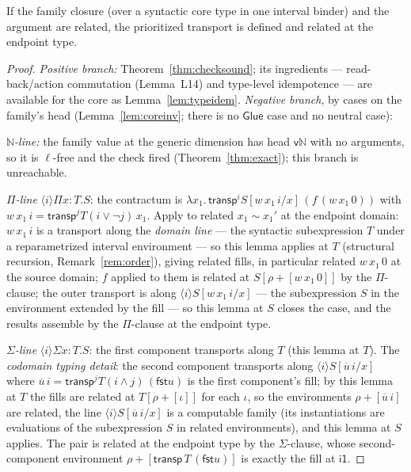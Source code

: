 \documentclass{lmcs}
\newcommand{\transp}{\mathsf{transp}}
\newcommand{\Glue}{\mathsf{Glue}}
\providecommand{\fst}{}\renewcommand{\fst}{\mathsf{fst}}
\newcommand{\ii}{\mathsf{i1}}
\begin{document}
\begin{lem}\label{lem:coretransp}
  If the family closure (over a syntactic core type in one
  interval binder) and the argument are related, the prioritized
  transport is defined and related at the endpoint type.
\end{lem}
\begin{proof}
  \emph{Positive branch:} Theorem~\ref{thm:checksound}; its
  ingredients --- read-back/action commutation (Lemma~L14) and
  type-level idempotence --- are available for the core as
  Lemma~\ref{lem:typeidem}.
  \emph{Negative branch}, by cases on the family's head
  (Lemma~\ref{lem:coreinv}; there is no $\Glue$ case and no neutral
  case):

  \emph{$\mathbb{N}$-line:} the family value at the generic
  dimension has head $\mathsf{v}\mathbb{N}$ with no arguments, so
  it is $\ell$-free and the check fired
  (Theorem~\ref{thm:exact}); this branch is unreachable.

  \emph{$\Pi$-line} $\langle i \rangle \Pi x{:}T.S$: the
  contractum is $\lambda x_1.\, \transp^i
  S[w\,x_1\,i/x]\,(f\,(w\,x_1\,0))$ with
  $w\,x_1\,i = \transp^j T(i \vee \neg j)\,x_1$.  Apply to related
  $x_1 \sim x_1'$ at the endpoint domain: $w\,x_1\,i$ is a
  transport along the \emph{domain line} --- the syntactic
  subexpression $T$ under a reparametrized interval environment
  --- so this lemma applies at $T$ (structural recursion,
  Remark~\ref{rem:order}), giving related fills, in particular
  related $w\,x_1\,0$ at the source domain; $f$ applied to them is
  related at $S[\rho{+}[w\,x_1\,0]]$ by the $\Pi$-clause; the
  outer transport is along $\langle i \rangle
  S[w\,x_1\,i/x]$ --- the subexpression $S$ in the environment
  extended by the fill --- so this lemma at $S$ closes the case,
  and the results assemble by the $\Pi$-clause at the endpoint
  type.

  \emph{$\Sigma$-line} $\langle i \rangle \Sigma x{:}T.S$: the
  first component transports along $T$ (this lemma at $T$).  The
  \emph{codomain typing detail}: the second component transports
  along $\langle i \rangle S[\overline{u}\,i/x]$ where
  $\overline{u}\,i = \transp^j T(i \wedge j)\,(\fst u)$ is the
  first component's fill; by this lemma at $T$ the fills are
  related at $T[\rho{+}[\iota]]$ for each $\iota$, so the
  environments $\rho{+}[\overline{u}\,i]$ are related, the line
  $\langle i \rangle S[\overline{u}\,i/x]$ is a computable family
  (its instantiations are evaluations of the subexpression $S$ in
  related environments), and this lemma at $S$ applies.  The pair
  is related at the endpoint type by the $\Sigma$-clause, whose
  second-component environment $\rho{+}[\transp\,T\,(\fst u)]$ is
  exactly the fill at $\ii$.


\end{proof}
\end{document}
